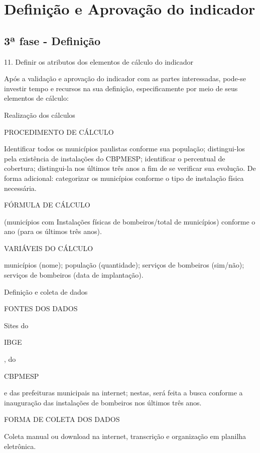 \documentclass[
  letterpaper,
  DIV=11,
  numbers=noendperiod]{scrreprt}
\begin{document}
\hypertarget{definiuxe7uxe3o-e-aprovauxe7uxe3o-do-indicador}{%
\chapter{Definição e Aprovação do
indicador}\label{definiuxe7uxe3o-e-aprovauxe7uxe3o-do-indicador}}

\hypertarget{uxaa-fase---definiuxe7uxe3o-1}{%
\section{3ª fase - Definição}\label{uxaa-fase---definiuxe7uxe3o-1}}

11. Definir os atributos dos elementos de cálculo do indicador

Após a validação e aprovação do indicador com as partes interessadas,
pode-se investir tempo e recursos na sua definição, especificamente por
meio de seus elementos de cálculo:

Realização dos cálculos

PROCEDIMENTO DE CÁLCULO

Identificar todos os municípios paulistas conforme sua população;
distingui-los pela existência de instalações do CBPMESP; identificar o
percentual de cobertura; distingui-la nos últimos três anos a fim de se
verificar sua evolução. De forma adicional: categorizar os municípios
conforme o tipo de instalação física necessária.

FÓRMULA DE CÁLCULO

(municípios com Instalações físicas de bombeiros/total de municípios)
conforme o ano (para os últimos três anos).

VARIÁVEIS DO CÁLCULO

municípios (nome); população (quantidade); serviços de bombeiros
(sim/não); serviços de bombeiros (data de implantação).

Definição e coleta de dados

FONTES DOS DADOS

Sites do

IBGE

, do

CBPMESP

e das prefeituras municipais na internet; nestas, será feita a busca
conforme a inauguração das instalações de bombeiros nos últimos três
anos.

FORMA DE COLETA DOS DADOS

Coleta manual ou download na internet, transcrição e organização em
planilha eletrônica.
\end{document}
